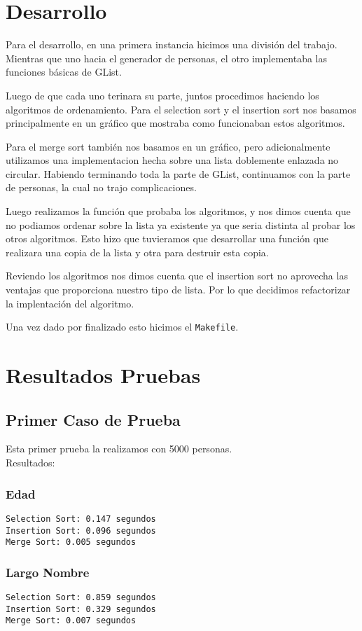 \documentclass[]{article}
\begin{document}
\section{Desarrollo}
Para el desarrollo, en una primera instancia hicimos una división del trabajo. Mientras que uno hacia el generador de personas, el otro implementaba las funciones básicas de GList.

Luego de que cada uno terinara su parte, juntos procedimos haciendo los algoritmos de ordenamiento.
Para el selection sort y el insertion sort nos basamos principalmente en un gráfico que mostraba como funcionaban estos algoritmos.

Para el merge sort también nos basamos en un gráfico, pero adicionalmente utilizamos una implementacion hecha sobre una lista doblemente enlazada no circular.
Habiendo terminando toda la parte de GList, continuamos con la parte de personas, la cual no trajo complicaciones.

Luego realizamos la función que probaba los algoritmos, y nos dimos cuenta que no podiamos ordenar sobre la lista ya existente ya que seria distinta al probar los otros algoritmos. Esto hizo que tuvieramos que desarrollar una función que realizara una copia de la lista y otra para destruir esta copia.

Reviendo los algoritmos nos dimos cuenta que el insertion sort no aprovecha las ventajas que proporciona nuestro tipo de lista. Por lo que decidimos refactorizar la implentación del algoritmo.

Una vez dado por finalizado esto hicimos el \verb|Makefile|.
\newpage
\section{Resultados Pruebas}
\subsection{Primer Caso de Prueba}
Esta primer prueba la realizamos con 5000 personas.\\
Resultados:

\subsubsection{Edad}
\verb|Selection Sort: 0.147 segundos|\\
\verb|Insertion Sort: 0.096 segundos|\\
\verb|Merge Sort: 0.005 segundos|\\
\subsubsection{Largo Nombre}
\verb|Selection Sort: 0.859 segundos|\\
\verb|Insertion Sort: 0.329 segundos|\\
\verb|Merge Sort: 0.007 segundos|\\
\end{document}
